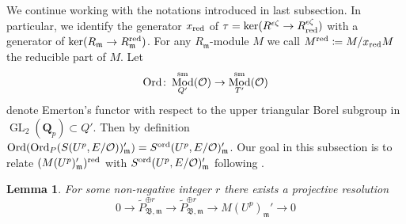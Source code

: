 \documentclass[leqno]{amsart}
\newtheorem{lem}[thm]{Lemma}
\theoremstyle{definition}
\theoremstyle{remark}
\newcommand{\oo}{\mathcal{O}}
\newcommand{\Qp}{\mathbf{Q}_p}
\DeclareMathOperator{\GL}{GL}
\newcommand{\fm}{\mathfrak{m}}
\DeclareMathOperator{\Mod}{\textnormal{Mod}}
\DeclareMathOperator{\Ord}{Ord} %
\newcommand{\B}{\mathfrak B} %
\newcommand{\sm}{\textnormal{sm}}
\newcommand{\red}{\textnormal{red}}
\newcommand{\xx}{x_\textnormal{red}}
\newcommand{\ord}{\textnormal{ord}} %
\begin{document}
We continue working with the notations introduced
in last subsection.
In particular, we identify the generator $\xx$ of
$\tau=\ker(R^{\epsilon\zeta}\to R^{\epsilon\zeta}_{\red})$
with a generator of 
$\ker(R_\fm\to R_\fm^{\red})$.
For any $R_{\fm}$-module $M$
we call $M^{\red}\coloneqq M/\xx M$
the reducible part of $M$.
Let
\[
    \Ord\colon 
    \Mod^{\sm}_{Q'}(\oo)\to \Mod^{\sm}_{T'}(\oo)
\]
denote Emerton's functor 
with respect to the upper triangular Borel subgroup 
in $\GL_2(\Qp)\subset Q'$.
Then by definition
$\Ord(\Ord_P(S(U^p,E/\oo))_\fm')=S^{\ord}(U^p,E/\oo)_\fm'$.
Our goal in this subsection is to 
relate $(M(U^p)_\fm')^{\red}$
with $S^{\ord}(U^p,E/\oo)_\fm'$
following \cite{urban}.

\begin{lem}
	For some non-negative integer $r$
	there exists a projective resolution 
	\begin{equation}\label{eq:resolution}
	0\to \tilde{P}_{\B,\fm}^{\oplus r}\to 
	\tilde{P}_{\B,\fm}^{\oplus r}\to 
	M(U^p)_{\fm}'\to 0
	\end{equation}
\end{lem}
\end{document}
